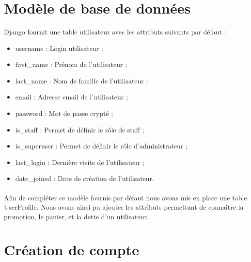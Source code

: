 \documentclass[twoside,UTF8]{EPURapport}
\begin{document}
    \section{Modèle de base de données}

        \paragraph{}Django fournit une table utilisateur avec les attributs suivants par défaut :\\
        \begin{itemize}
            \item username : Login utilisateur ;\\
            \item first\_name : Prénom de l'utilisateur ;\\
            \item last\_name : Nom de famille de l'utilisateur ;\\
            \item email : Adresse email de l'utilisateur ; \\
            \item password : Mot de passe crypté ;\\
            \item is\_staff : Permet de définir le rôle de staff ;\\
            \item is\_superuser : Permet de définir le rôle d'administrateur ;\\
            \item last\_login : Dernière visite de l'utilisateur ;\\
            \item date\_joined : Date de création de l'utilisateur.\\
        \end{itemize}

        \paragraph{}Afin de compléter ce modèle fournis par défaut nous avons mis en place une table UserProfile. Nous avons ainsi pu ajouter les attributs permettant de connaitre la promotion, le panier, et la dette d'un utilisateur.

    \section{Création de compte}
\end{document}
